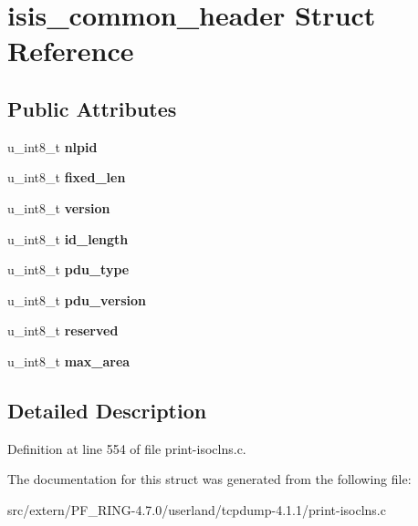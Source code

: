 \hypertarget{structisis__common__header}{
\section{isis\_\-common\_\-header Struct Reference}
\label{structisis__common__header}
}
\subsection*{Public Attributes}
\begin{DoxyCompactItemize}
\item 
\hypertarget{structisis__common__header_a67863eb1cd1cfc10b012531737bcea84}{
u\_\-int8\_\-t {\bfseries nlpid}}
\label{structisis__common__header_a67863eb1cd1cfc10b012531737bcea84}

\item 
\hypertarget{structisis__common__header_a5dc6a921bb2949dbe931bb33d1a1b0dd}{
u\_\-int8\_\-t {\bfseries fixed\_\-len}}
\label{structisis__common__header_a5dc6a921bb2949dbe931bb33d1a1b0dd}

\item 
\hypertarget{structisis__common__header_ad001b44b65597a3ef711814d2b228b8c}{
u\_\-int8\_\-t {\bfseries version}}
\label{structisis__common__header_ad001b44b65597a3ef711814d2b228b8c}

\item 
\hypertarget{structisis__common__header_a429f360ab95208e941e2c8ec6a1026b0}{
u\_\-int8\_\-t {\bfseries id\_\-length}}
\label{structisis__common__header_a429f360ab95208e941e2c8ec6a1026b0}

\item 
\hypertarget{structisis__common__header_a2dff9cf63761db11fca56282d33b3e9f}{
u\_\-int8\_\-t {\bfseries pdu\_\-type}}
\label{structisis__common__header_a2dff9cf63761db11fca56282d33b3e9f}

\item 
\hypertarget{structisis__common__header_a3d8815f08caf5e8e5b141ec9ea7f07e9}{
u\_\-int8\_\-t {\bfseries pdu\_\-version}}
\label{structisis__common__header_a3d8815f08caf5e8e5b141ec9ea7f07e9}

\item 
\hypertarget{structisis__common__header_aef0185f43baf29eaf2e054c58f10c11b}{
u\_\-int8\_\-t {\bfseries reserved}}
\label{structisis__common__header_aef0185f43baf29eaf2e054c58f10c11b}

\item 
\hypertarget{structisis__common__header_acfaddc9ae0e02766281a0e0d5ac7690b}{
u\_\-int8\_\-t {\bfseries max\_\-area}}
\label{structisis__common__header_acfaddc9ae0e02766281a0e0d5ac7690b}

\end{DoxyCompactItemize}


\subsection{Detailed Description}


Definition at line 554 of file print-\/isoclns.c.



The documentation for this struct was generated from the following file:\begin{DoxyCompactItemize}
\item 
src/extern/PF\_\-RING-\/4.7.0/userland/tcpdump-\/4.1.1/print-\/isoclns.c\end{DoxyCompactItemize}
